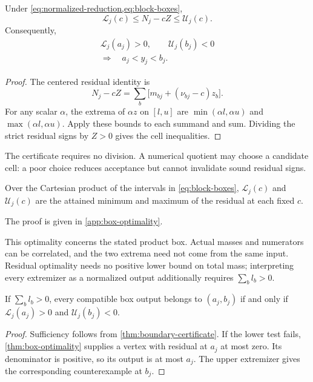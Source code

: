 \begin{theorem}\label{thm:boundary-certificate}
Under \cref{eq:normalized-reduction,eq:block-boxes},
\begin{equation}
 \mathcal L_j(c)\le N_j-cZ\le\mathcal U_j(c).
 \label{eq:residual-enclosure}
\end{equation}
Consequently,
\begin{equation}
 \begin{gathered}
 \mathcal L_j(a_j)>0,\qquad \mathcal U_j(b_j)<0\\
 \Longrightarrow\quad a_j<y_j<b_j.
 \end{gathered}
 \label{eq:cell-certificate}
\end{equation}
\end{theorem}
\begin{proof}
The centered residual identity is
\begin{equation}
 N_j-cZ=\sum_b\bigl[m_{bj}+(\nu_{bj}-c)z_b\bigr].
 \label{eq:residual-identity}
\end{equation}
For any scalar $\alpha$, the extrema of $\alpha z$ on $[l,u]$ are
$\min(\alpha l,\alpha u)$ and $\max(\alpha l,\alpha u)$. Apply these bounds
to each summand and sum. Dividing the strict residual signs by $Z>0$ gives
the cell inequalities.
\end{proof}

The certificate requires no division. A numerical quotient may choose a
candidate cell: a poor choice reduces acceptance but cannot invalidate sound
residual signs.

\begin{theorem}\label{thm:box-optimality}
Over the Cartesian product of the intervals in \cref{eq:block-boxes},
$\mathcal L_j(c)$ and $\mathcal U_j(c)$ are the attained minimum and maximum
of the residual at each fixed $c$.
\end{theorem}
The proof is given in \cref{app:box-optimality}.

This optimality concerns the stated product box. Actual masses and numerators
can be correlated, and the two extrema need not come from the same input.
Residual optimality needs no positive lower bound on total mass; interpreting
every extremizer as a normalized output additionally requires $\sum_b l_b>0$.

\begin{corollary}\label{cor:box-sufficiency}
If $\sum_b l_b>0$, every compatible box output belongs to $(a_j,b_j)$ if and
only if $\mathcal L_j(a_j)>0$ and $\mathcal U_j(b_j)<0$.
\end{corollary}
\begin{proof}
Sufficiency follows from \cref{thm:boundary-certificate}. If the lower test
fails, \cref{thm:box-optimality} supplies a vertex with residual at $a_j$ at
most zero. Its denominator is positive, so its output is at most $a_j$.
The upper extremizer gives the corresponding counterexample at $b_j$.
\end{proof}

